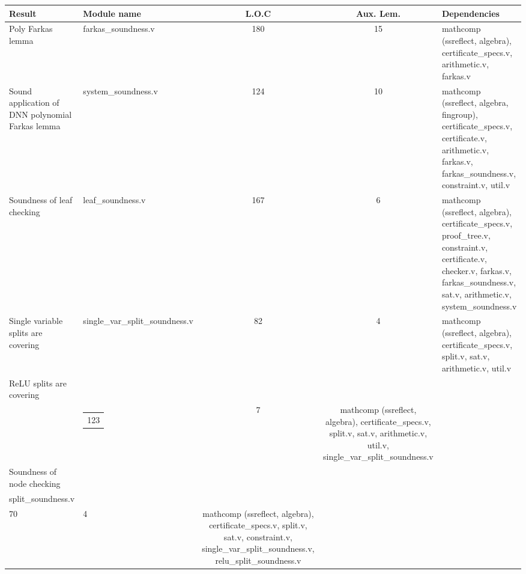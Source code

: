 \begin{table}[ht]
\centering
\scriptsize
\begin{tabularx}{\textwidth}{
    @{}
    p{}
    p{}
    c
    c
    X
    @{}}
\toprule
\textbf{Result} &
\textbf{Module name} &
\textbf{L.O.C} &
\textbf{Aux. Lem.} &
\textbf{Dependencies} \\
\midrule

Poly Farkas lemma
&
farkas\_soundness.v
&
180
&
15
&
mathcomp (ssreflect, algebra),
certificate\_specs.v,
arithmetic.v, farkas.v
\\
\midrule

Sound application of DNN polynomial Farkas lemma
&
system\_soundness.v
&
124
&
10
&
mathcomp (ssreflect, algebra, fingroup),
certificate\_specs.v, certificate.v,
arithmetic.v, farkas.v,
farkas\_soundness.v, constraint.v,
util.v
\\
\midrule

Soundness of leaf checking
&
leaf\_soundness.v
&
167
&
6
&
mathcomp (ssreflect, algebra),
certificate\_specs.v, proof\_tree.v,
constraint.v, certificate.v,
checker.v, farkas.v,
farkas\_soundness.v, sat.v,
arithmetic.v, system\_soundness.v
\\
\midrule

Single variable splits are covering
&
single\_var\_split\_soundness.v
&
82
&
4
&
mathcomp (ssreflect, algebra),
certificate\_specs.v, split.v,
sat.v, arithmetic.v, util.v
\\
\midrule

ReLU splits are covering
&
\begin{tabular}[t]{@{}l@{}}
relu\_split\_soundness.v\\
\end{tabular}
&
\begin{tabular}[t]{@{}c@{}}
123
\end{tabular}
&
7
&
mathcomp (ssreflect, algebra),
certificate\_specs.v, split.v,
sat.v, arithmetic.v, util.v,
single\_var\_split\_soundness.v
\\
\midrule

Soundness of node checking
&
\begin{tabular}[t]{@{}l@{}}
node\_soundness.v\\
split\_soundness.v
\end{tabular}
&
\begin{tabular}[t]{@{}c@{}}
68\\
70
\end{tabular}
&
4
&
mathcomp (ssreflect, algebra),
certificate\_specs.v, split.v,
sat.v, constraint.v,
single\_var\_split\_soundness.v,
relu\_split\_soundness.v
\\
\midrule


\end{tabularx}
\end{table}
